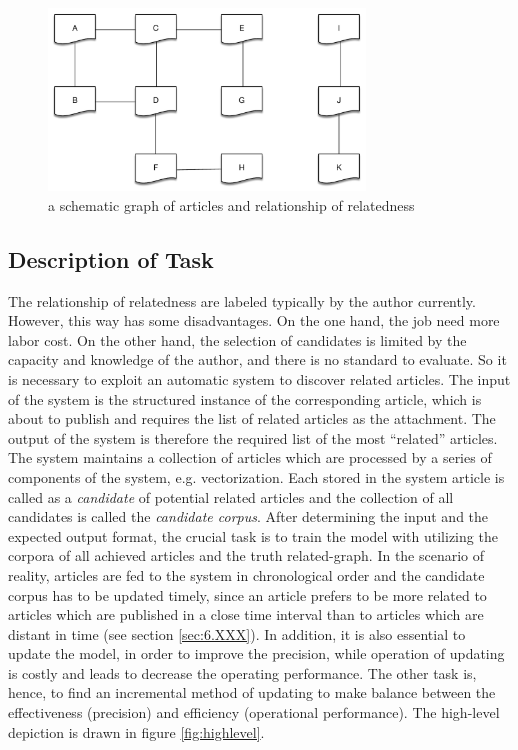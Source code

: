 \begin{figure}[!htb]
    \centering
    \includegraphics[width=0.75\textwidth]{fig/relatedness.pdf}
    \caption{a schematic graph of articles and relationship of relatedness}
    \label{fig:relatedness}
\end{figure}

\bigbreak
\subsection{Description of Task}
\label{sec:3.2}

The relationship of relatedness are labeled typically by the author currently. However, this way has some disadvantages. On the one hand, the job need more labor cost. On the other hand, the selection of candidates is limited by the capacity and knowledge of the author, and there is no standard to evaluate. So it is necessary to exploit an automatic system to discover related articles. The input of the system is the structured instance of the corresponding article, which is about to publish and requires the list of related articles as the attachment. The output of the system is therefore the required list of the most ``related'' articles. The system maintains a collection of articles which are processed by a series of components of the system, e.g. vectorization. Each stored in the system article is called as a \textit{candidate} of potential related articles and the collection of all candidates is called the \textit{candidate corpus}. After determining the input and the expected output format, the crucial task is to train the model with utilizing the corpora of all achieved articles and the truth related-graph. In the scenario of reality, articles are fed to the system in chronological order and the candidate corpus has to be updated timely, since an article prefers to be more related to articles which are published in a close time	interval than to articles which are distant in time (see section \ref{sec:6.XXX}). In addition, it is also essential to update the model, in order to improve the precision, while operation of updating is costly and leads to decrease the operating performance. The other task is, hence, to find an incremental method of updating to make balance between the effectiveness (precision) and efficiency (operational performance). The high-level depiction is drawn in figure \ref{fig:highlevel}. 

